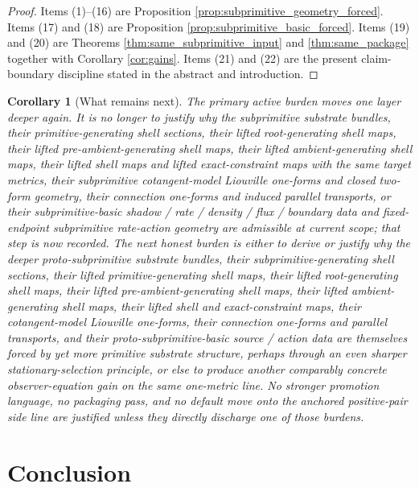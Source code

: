 \documentclass[11pt]{article}
\newtheorem{corollary}{Corollary}
\begin{document}
\begin{proof}
Items (1)--(16) are Proposition \ref{prop:subprimitive_geometry_forced}. Items (17) and (18) are Proposition \ref{prop:subprimitive_basic_forced}. Items (19) and (20) are Theorems \ref{thm:same_subprimitive_input} and \ref{thm:same_package} together with Corollary \ref{cor:gains}. Items (21) and (22) are the present claim-boundary discipline stated in the abstract and introduction.
\end{proof}

\begin{corollary}[What remains next]
\label{cor:what_next}
The primary active burden moves one layer deeper again. It is no longer to justify why the subprimitive substrate bundles, their primitive-generating shell sections, their lifted root-generating shell maps, their lifted pre-ambient-generating shell maps, their lifted ambient-generating shell maps, their lifted shell maps and lifted exact-constraint maps with the same target metrics, their subprimitive cotangent-model Liouville one-forms and closed two-form geometry, their connection one-forms and induced parallel transports, or their subprimitive-basic shadow / rate / density / flux / boundary data and fixed-endpoint subprimitive rate-action geometry are admissible at current scope; that step is now recorded. The next honest burden is either to derive or justify why the deeper proto-subprimitive substrate bundles, their subprimitive-generating shell sections, their lifted primitive-generating shell maps, their lifted root-generating shell maps, their lifted pre-ambient-generating shell maps, their lifted ambient-generating shell maps, their lifted shell and exact-constraint maps, their cotangent-model Liouville one-forms, their connection one-forms and parallel transports, and their proto-subprimitive-basic source / action data are themselves forced by yet more primitive substrate structure, perhaps through an even sharper stationary-selection principle, or else to produce another comparably concrete observer-equation gain on the same one-metric line. No stronger promotion language, no packaging pass, and no default move onto the anchored positive-pair side line are justified unless they directly discharge one of those burdens.
\end{corollary}

\section{Conclusion}
\end{document}
